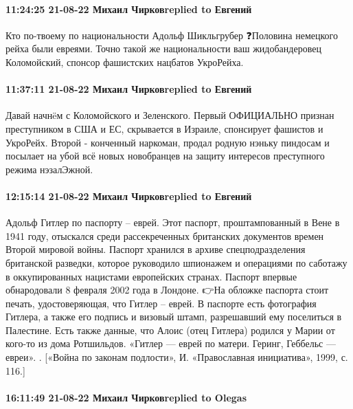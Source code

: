 \paragraph{11:24:25 21-08-22 Михаил Чирковreplied to Евгений}

Кто по-твоему по национальности Адольф Шикльгрубер ❓Половина немецкого рейха были евреями.
Точно такой же национальности ваш жидобандеровец Коломойский, спонсор фашистских нацбатов УкроРейха.

\paragraph{11:37:11 21-08-22 Михаил Чирковreplied to Евгений}

Давай начнëм с Коломойского и Зеленского.
Первый ОФИЦИАЛЬНО признан преступником в США и ЕС, скрывается в Израиле, спонсирует фашистов и УкроРейх.
Второй - конченный наркоман, продал родную нэньку пиндосам и посылает на убой всё новых новобранцев на защиту интересов преступного режима нэзалЭжной.

\paragraph{12:15:14 21-08-22 Михаил Чирковreplied to Евгений}

Адольф Гитлер по паспорту – еврей.
Этот паспорт, проштампованный в Вене в 1941 году, отыскался среди рассекреченных британских документов времен Второй мировой войны. Паспорт хранился в архиве спецподразделения британской разведки, которое руководило шпионажем и операциями по саботажу в оккупированных нацистами европейских странах. Паспорт впервые обнародовали 8 февраля 2002 года в Лондоне.
👉На обложке паспорта стоит печать, удостоверяющая, что Гитлер – еврей. В паспорте есть фотография Гитлера, а также его подпись и визовый штамп, разрешавший ему поселиться в Палестине. Есть также данные, что Алоис (отец Гитлера) родился у Марии от кого-то из дома Ротшильдов. «Гитлер — еврей по матери. Геринг, Геббельс — евреи».
. [«Война по законам подлости», И. «Православная инициатива», 1999, с. 116.]

\paragraph{16:11:49 21-08-22 Михаил Чирковreplied to Olegas}


